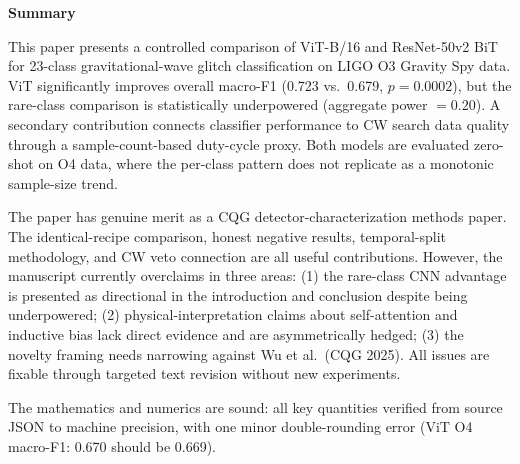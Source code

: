 \documentclass[11pt]{article}
\begin{document}
\begin{SummaryBox}
\textbf{Summary}

This paper presents a controlled comparison of ViT-B/16 and ResNet-50v2 BiT for 23-class gravitational-wave glitch classification on LIGO O3 Gravity Spy data. ViT significantly improves overall macro-F1 (0.723 vs.\ 0.679, $p = 0.0002$), but the rare-class comparison is statistically underpowered (aggregate power $= 0.20$). A secondary contribution connects classifier performance to CW search data quality through a sample-count-based duty-cycle proxy. Both models are evaluated zero-shot on O4 data, where the per-class pattern does not replicate as a monotonic sample-size trend.

The paper has genuine merit as a CQG detector-characterization methods paper. The identical-recipe comparison, honest negative results, temporal-split methodology, and CW veto connection are all useful contributions. However, the manuscript currently overclaims in three areas: (1) the rare-class CNN advantage is presented as directional in the introduction and conclusion despite being underpowered; (2) physical-interpretation claims about self-attention and inductive bias lack direct evidence and are asymmetrically hedged; (3) the novelty framing needs narrowing against Wu et al.\ (CQG 2025). All issues are fixable through targeted text revision without new experiments.

The mathematics and numerics are sound: all key quantities verified from source JSON to machine precision, with one minor double-rounding error (ViT O4 macro-F1: 0.670 should be 0.669).
\end{SummaryBox}

\end{document}
